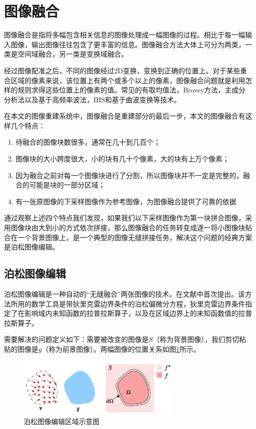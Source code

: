 \section{图像融合}

图像融合是指将多幅包含相关信息的图像处理成一幅图像的过程。相比于每一幅输入图像，输出图像往往包含了更丰富的信息。图像融合方法大体上可分为两类，一类是空间域融合，另一类是变换域融合。

经过图像配准之后，不同的图像经过2D变换，变换到正确的位置上。对于某些重合区域的像素来说，该位置上有两个或多个以上的像素，图像融合问题就是利用怎样的规则求得这些位置上的像素的值。常见的有取均值法，Brovey方法，主成分分析法以及基于高频率波法，IHS和基于曲波变换等技术。

在本文的图像重建系统中，图像融合是重建部分的最后一步，本文的图像融合有这样几个特点：

\begin{enumerate}
\item 待融合的图像块数很多，通常在几十到几百个；
\item 图像块的大小跨度很大，小的块有几十个像素，大的块有上万个像素；
\item 因为融合之前对每一个图像块进行了分割，所以图像块并不一定是完整的，融合的可能是块的一部分区域；
\item 有一张原图像的下采样图像作为参考图像，为图像融合提供了可靠的依据
\end{enumerate}

通过观察上述四个特点我们发现，如果我们以下采样图像作为第一块拼合图像，采用图像块由大到小的方式依次拼接，那么图像融合的任务转变成逐一将小图像块贴合在一个背景图像上，是一个典型的图像无缝拼接任务，解决这个问题的经典方案是泊松图像编辑。

\subsection{泊松图像编辑}
泊松图像编辑是一种自动的“无缝融合”两张图像的技术，在文献\cite{Perez:2003ul}中首次提出。该方法所用的数学工具是带狄里克雷边界条件的泊松偏微分方程，狄里克雷边界条件指定了在影响域内未知函数的拉普拉斯算子，以及在区域边界上的未知函数值的拉普拉斯算子\cite{张建桥:2010vm}。

需要解决的问题定义如下：需要被改变的图像是\(S\)（称为背景图像），我们剪切粘贴的图像是\(g\)（称为前景图像）。两幅图像的位置关系如图\ref{fig:poi_dis}所示。

\begin{figure}
\centering\includegraphics[width=8.00cm]{imgs/ch2/poi_dis}
\caption{泊松图像编辑区域示意图}
\label{fig:poi_dis}
\end{figure}

